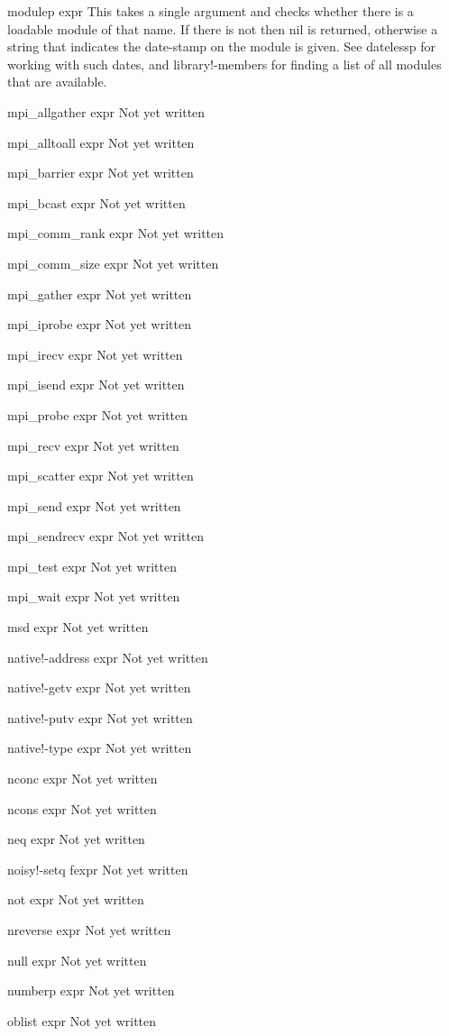 \documentclass[a4paper,11pt]{article}
\begin{document}
\begin{description}
modulep expr
This takes a single argument and checks whether there is a loadable module
of that name. If there is not then {\ttfamily nil} is returned, otherwise a
string that indicates the date-stamp on the module is given. See
{\ttfamily datelessp} for working with such dates, and {\ttfamily
library!-members} for finding a list of all modules that are available.
  

mpi\_allgather expr
Not yet written

mpi\_alltoall expr
Not yet written

mpi\_barrier expr
Not yet written

mpi\_bcast expr
Not yet written

mpi\_comm\_rank expr
Not yet written

mpi\_comm\_size expr
Not yet written

mpi\_gather expr
Not yet written

mpi\_iprobe expr
Not yet written

mpi\_irecv expr
Not yet written

mpi\_isend expr
Not yet written

mpi\_probe expr
Not yet written

mpi\_recv expr
Not yet written

mpi\_scatter expr
Not yet written

mpi\_send expr
Not yet written

mpi\_sendrecv expr
Not yet written

mpi\_test expr
Not yet written

mpi\_wait expr
Not yet written

msd expr
Not yet written

native!-address expr
Not yet written

native!-getv expr
Not yet written

native!-putv expr
Not yet written

native!-type expr
Not yet written

nconc expr
Not yet written

ncons expr
Not yet written

neq expr
Not yet written

noisy!-setq fexpr
Not yet written

not expr
Not yet written

nreverse expr
Not yet written

null expr
Not yet written

numberp expr
Not yet written

oblist expr
Not yet written


\end{description}
\end{document}

